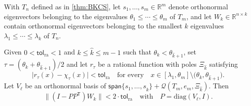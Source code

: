 \documentclass[10pt,a4paper]{amsart}
\newcommand{\R}{\mathbb{R}}
\newcommand{\Ttran}{\mathsf{T}}
\newcommand{\tol}{\mathsf{tol}}
\providecommand{\abs}[1]{\lvert#1\rvert}
\providecommand{\diagm}{\mathrm{diag}}
\providecommand{\norm}[1]{\lVert#1\rVert}
\providecommand{\spa}[1]{\mathsf{span}\{#1\}}
\begin{document}
\begin{theorem}
    \label{thm1}
    With $T_{n}$ defined as in \cref{thm:BKCS}, let
    $s_{1},\dotsc,s_{m} \in \R^m$ denote orthonormal eigenvectors 
    belonging to the eigenvalues  
    $\theta_{1}\leq \dotsb\leq \theta_{m}$ of $T_{m}$, and let 
    $W_k \in \R^{n \times k}$ contain 
    orthonormal eigenvectors belonging to the smallest $k$ eigenvalues $\lambda_1 \le \cdots \le \lambda_k$ of $T_n$.
    
    Given $0<\tol_{\mathrm{ra}}<1$ and $k\leq \widehat{k}\leq m-1$ such that $\theta_k < \theta_{\widehat{k}+1}$, set $\tau=(\theta_{k}+\theta_{\widehat{k}+1})/2$ and let $r_{\tau}$ be a rational function with poles $\Xi_{\widehat{k}}$ satisfying
    \begin{equation}
        \label{con:ratapp}
        \abs{r_{\tau}(x)-\chi_{\tau}(x)} <  \tol_{\mathrm{ra}} \quad \text{for every}\quad x \in \left[\lambda_{1},\theta_{m}\right]\setminus \big(\theta_k,\theta_{\widehat{k}+1}\big).
    \end{equation}
    Let $V_{\ell}$ be an orthonormal basis of $\spa{s_{1},\dotsc,s_{\widehat{k}}}+\mathcal{Q}(T_{m},e_{m},\Xi_{\widehat{k}})$. Then
    \begin{equation*}
        \norm{(I-PP^{\Ttran})W_{k}} < 2 \cdot \tol_{\mathrm{ra}} \quad {\mathrm{with}} \quad P=\diagm(V_{\ell},I).
    \end{equation*}
\end{theorem}
\end{document}
